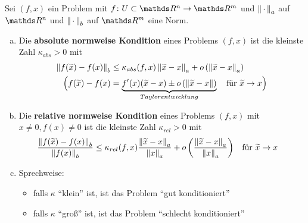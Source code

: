 


\begin{Defe}
  Sei $(f,x)$ ein Problem mit $f\colon U\subset \R^n \to \R^m$
  und $\left\| \,\cdot\, \right\|_a$ auf $\R^n$ und $\left\| \,\cdot\, \right\|_b$ auf $\R^m$ eine Norm.
  \begin{enumerate}[a)]
  \item Die \textbf{absolute normweise Kondition} eines Problems $(f,x)$ ist die kleinste Zahl 
    $\kappa _{abs} > 0 $ mit
    \begin{align}
      \left\| f(\widetilde{x})-f(x) \right\|_b &\leq \kappa _{abs}(f,x) \left\| \widetilde{x}-x \right\|_a
                                     + o\left(\left\| \widetilde{x}-x \right\|_a\right) \label{III.2.2} \\\nonumber
      \Bigl(f(\widetilde{x})- f(x) 
                                   &=\underbrace{ f'(x)(\widetilde{x}-x)\pm o\left(\left\| \widetilde{x}-x \right\|\right)}_{Taylorentwicklung}
                                     \quad \text{für }\widetilde{x}\rightarrow x 
                                     \Bigr)
    \end{align}
  \item Die \textbf{relative normweise Kondition} eines Problems $(f,x)$  mit $x\neq 0, f(x) \neq 0$
    ist die kleinste Zahl 
    $\kappa _{rel} > 0 $ mit
    \begin{align}
      \frac{	\left\| f(\widetilde{x})-f(x) \right\|_b }{\left\| f(x) \right\|_b}
      &\leq \kappa _{rel}(f,x)\frac{ \left\| \widetilde{x}-x \right\|_a}{\left\| x \right\|_a}
        + 
        o\left(\frac{\left\| \widetilde{x}-x \right\|_a}{\left\| x \right\|_a}\right) \label{III.2.3}
      &&	\text{für } \widetilde{x} \rightarrow x
    \end{align}
  \item Sprechweise:
    \begin{itemize}
    \item falls $\kappa$ \enquote{klein} ist, ist das Problem \enquote{gut konditioniert}
    \item falls $\kappa$ \enquote{groß} ist, ist das Problem \enquote{schlecht konditioniert}
    \end{itemize}
  \end{enumerate}
\end{Defe}

